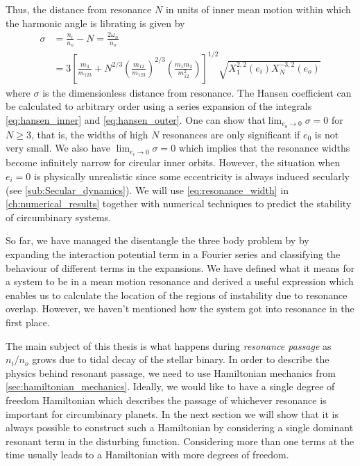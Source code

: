 Thus, the distance from resonance $N$ in units of inner mean motion
within which the harmonic angle is librating is given by
\begin{equation}
    \begin{aligned}
        \sigma&=\frac{n_i}{n_o} -N= \frac{2\omega_n}{n_o}\\ 
        &= 3\left[ \frac{m_3}{m_{123}} +
    N^{2/3}\left( \frac{m_{12}}{m_{123}}
        \right)^{2/3}\left( \frac{m_1m_2}{m_{12}^2} \right)\right]^{1/2}
        \sqrt{X^{2,2}_1(e_i)X^{-3,2}_N(e_o)}
    \end{aligned}
    \label{eq:resonance_width}
\end{equation}
where $\sigma$ is the dimensionless distance from resonance. The Hansen
coefficient can be calculated to arbitrary order using a series expansion
of the integrals \ref{eq:hansen_inner} and \ref{eq:hansen_outer}. One can
show that$\lim_{e_o\rightarrow 0}\sigma=0$ for $N\geq 3$, that is, the 
widths of high $N$ resonances are only significant if $e_0$ is not very
small. We also have $\lim_{e_i\rightarrow 0}\sigma=0$ which implies that
the resonance widths become infinitely narrow for circular inner orbits.
However, the situation when $e_i=0$ is physically unrealistic since some
eccentricity is always induced secularly (see \cref{sub:Secular_dynamics}).
We will use \cref{eq:resonance_width} in 
\cref{ch:numerical_results} together with numerical techniques to predict the
stability of circumbinary systems.

So far, we have managed the disentangle the three body problem by
by expanding the interaction potential term in a Fourier series and 
classifying the behaviour of different terms in the expansions. We have
defined what it means for a system to be in a mean motion resonance and
derived a useful expression which enables us to calculate the location of 
the regions of instability due to resonance overlap. However, we haven't
mentioned how the system got into resonance in the first place. 

The main
subject of this thesis is what happens during  \emph{resonance
passage} as $n_i/n_o$ grows due to tidal decay of the stellar binary.
In order to describe the physics behind resonant passage, we need to use
Hamiltonian mechanics from \cref{sec:hamiltonian_mechanics}. Ideally, we
would like to have a single degree of freedom Hamiltonian which describes
the passage of whichever resonance is important for circumbinary planets.
In the next section we will show that it is always possible to construct 
such a Hamiltonian by considering a single dominant resonant term in 
the disturbing function. Considering more than one terms at the time
usually leads to a Hamiltonian with more degrees of freedom.
